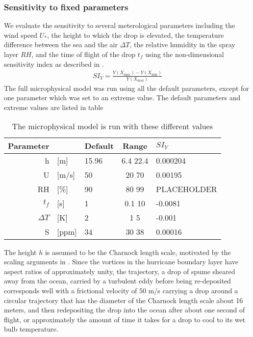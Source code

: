 \documentclass[10pt,a4paper]{article}
\begin{document}
\subsubsection{Sensitivity to fixed parameters}

We evaluate the sensitivity to several meterological parameters including the wind speed $U_*$, the height to which the drop is elevated, the temperature difference between the sea and the air $\Delta T$, the relative humidity in the spray layer $RH$,  and the time of flight of the drop $t_f$ using the non-dimensional sensitivity index as described in \citet{Hamby1994}.\\
\begin{align}
SI_Y = \frac{Y(X_{\max}) - Y(X_{\min})}{Y(X_{\max})}
\end{align}
The full microphysical model was run using all the default parameters, except for one parameter which was set to an extreme value. The default parameters and extreme values are listed in table 

\begin{table}[h]
\centering
\begin{tabular}{r l l c l }
Parameter& & Default & Range & $SI_Y$\\
\hline
h &[m] & 15.96 & 6.4 22.4 & 0.000204  \\
U &[m/s] & 50 & 20 70 & 0.00195  \\
RH &[\%] & 90 & 80 99 & PLACEHOLDER  \\
$t_f$ &[s] & 1 & 0.1 10 & -0.0081  \\
$\Delta T$ &[K] & 2 & 1 5 & -0.001  \\
S &[ppm] & 34 & 30 38 & 0.00016 \\
\end{tabular}
\caption{The microphysical model is run with these different values}
\end{table}


The height $h$ is assumed to be the Charnock length scale, motivated by the scaling arguments in \citet{Emanuel2003}.
Since the vortices in the hurricane boundary layer have aspect ratios of approximately unity, the trajectory, a drop of spume sheared away from the ocean, carried by a turbulent eddy before being re-deposited corresponds well with a frictional velocity of 50 m/s carrying a drop around a circular trajectory that has the diameter of the Charnock length scale about 16 meters, and then redepositing the drop into the ocean after about one second of flight, or approximately the amount of time it takes for a drop to cool to its wet bulb temperature.  
\end{document}
